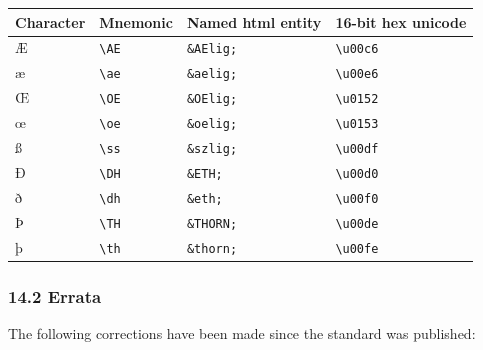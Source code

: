 \documentclass[oneside]{book}
\begin{document}
\begin{longtable}[]{@{}llll@{}}
\toprule
Character & Mnemonic & Named html entity & 16-bit hex
unicode\tabularnewline
\midrule
\endhead
Æ & \texttt{\textbackslash{}AE} & \texttt{\&AElig;} &
\texttt{\textbackslash{}u00c6}\tabularnewline
æ & \texttt{\textbackslash{}ae} & \texttt{\&aelig;} &
\texttt{\textbackslash{}u00e6}\tabularnewline
Œ & \texttt{\textbackslash{}OE} & \texttt{\&OElig;} &
\texttt{\textbackslash{}u0152}\tabularnewline
œ & \texttt{\textbackslash{}oe} & \texttt{\&oelig;} &
\texttt{\textbackslash{}u0153}\tabularnewline
ß & \texttt{\textbackslash{}ss} & \texttt{\&szlig;} &
\texttt{\textbackslash{}u00df}\tabularnewline
Ð & \texttt{\textbackslash{}DH} & \texttt{\&ETH;} &
\texttt{\textbackslash{}u00d0}\tabularnewline
ð & \texttt{\textbackslash{}dh} & \texttt{\&eth;} &
\texttt{\textbackslash{}u00f0}\tabularnewline
Þ & \texttt{\textbackslash{}TH} & \texttt{\&THORN;} &
\texttt{\textbackslash{}u00de}\tabularnewline
þ & \texttt{\textbackslash{}th} & \texttt{\&thorn;} &
\texttt{\textbackslash{}u00fe}\tabularnewline
\bottomrule
\end{longtable}

\hypertarget{errata}{\subsubsection{14.2 Errata}\label{errata}}

The following corrections have been made since the standard was
published:
\end{document}
